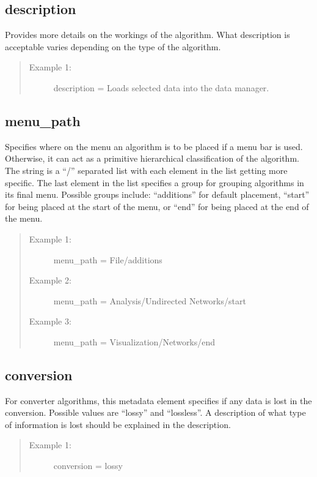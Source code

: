 \subsection*{description}
Provides more details on the workings of the algorithm. What
description is acceptable varies depending on the type of the algorithm.

\begin{quote}
\begin{description}
  \item[Example 1:] description = Loads selected data into the data manager. 
\end{description}
\end{quote}


\subsection*{menu\_path}
Specifies where on the menu an algorithm is to be
placed if a menu bar is used. Otherwise, it can act as a primitive hierarchical
classification of the algorithm. The string is a ``/'' separated list with
each element in the list getting more specific. The last element in the list
specifies a group for grouping algorithms in its final menu. Possible groups
include: ``additions'' for default placement, ``start'' for being placed at
the start of the menu, or ``end'' for being placed at the end of the menu.

\begin{quote}
\begin{description}
  \item[Example 1:] menu\_path = File/additions
  \item[Example 2:] menu\_path = Analysis/Undirected Networks/start
  \item[Example 3:] menu\_path = Visualization/Networks/end
\end{description}
\end{quote}


\subsection*{conversion}
For converter algorithms, this metadata element specifies if any data is
lost in the conversion. Possible values are ``lossy'' and ``lossless''. A
description of what type of information is lost should be explained in the
description.

\begin{quote}
\begin{description}
  \item[Example 1:] conversion = lossy 
\end{description}
\end{quote}


